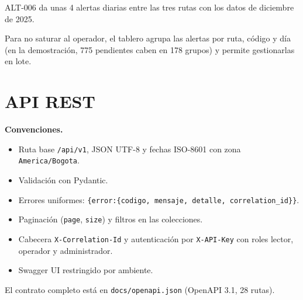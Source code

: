 \documentclass[10pt,a4paper]{article}
\newcommand{\cod}[1]{\texttt{\small #1}}
\begin{document}
ALT-006 da unas 4 alertas diarias entre las tres rutas con los datos de diciembre de 2025.

Para no saturar al operador, el tablero agrupa las alertas por ruta, código y día (en la demostración, 775 pendientes caben en 178 grupos) y permite gestionarlas en lote.

\section{API REST}

\textbf{Convenciones.}

\begin{itemize}
  \item Ruta base \cod{/api/v1}, JSON UTF-8 y fechas ISO-8601 con zona \cod{America/Bogota}.
  \item Validación con Pydantic.
  \item Errores uniformes: \cod{\{error:\{codigo, mensaje, detalle, correlation\_id\}\}}.
  \item Paginación (\cod{page}, \cod{size}) y filtros en las colecciones.
  \item Cabecera \cod{X-Correlation-Id} y autenticación por \cod{X-API-Key} con roles lector, operador y administrador.
  \item Swagger UI restringido por ambiente.
\end{itemize}

El contrato completo está en \cod{docs/openapi.json} (OpenAPI 3.1, 28 rutas).
\end{document}
